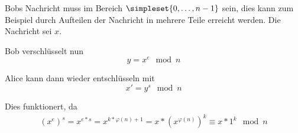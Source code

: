 Bobs Nachricht muss im Bereich $\simpleset{0,\ldots,n-1}$ sein, dies kann zum Beispiel durch Aufteilen der Nachricht in mehrere Teile erreicht werden. Die Nachricht sei $x$.

Bob verschlüsselt nun
\begin{equation*}
	y=x^e\mod n
\end{equation*}

Alice kann dann wieder entschlüsseln mit
\begin{equation*}
	x'=y^s\mod n
\end{equation*}

Dies funktionert, da
\begin{align*}
	(x^e)^s = x^{e*s}=x^{k*\varphi(n)+1}=x*(x^{\varphi(n)})^k\equiv x*1^k\mod n
\end{align*}